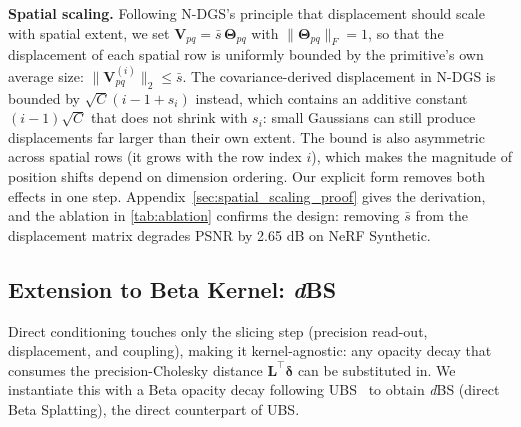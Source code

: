\documentclass{article}
\newcommand{\dbs}{\textit{d}BS\xspace}
\theoremstyle{plain}
\theoremstyle{definition}
\theoremstyle{remark}
\begin{document}
\textbf{Spatial scaling.} Following N-DGS's principle that displacement should scale with spatial extent, we set $\mathbf{V}_{pq}=\bar{s}\,\boldsymbol{\Theta}_{pq}$ with $\|\boldsymbol{\Theta}_{pq}\|_F=1$, so that the displacement of each spatial row is uniformly bounded by the primitive's own average size: $\|\mathbf{V}_{pq}^{(i)}\|_2\le\bar{s}$. The covariance-derived displacement in N-DGS is bounded by $\sqrt{C}(i-1+s_i)$ instead, which contains an additive constant $(i-1)\sqrt{C}$ that does not shrink with $s_i$: small Gaussians can still produce displacements far larger than their own extent. The bound is also asymmetric across spatial rows (it grows with the row index $i$), which makes the magnitude of position shifts depend on dimension ordering. Our explicit form removes both effects in one step. Appendix~\ref{sec:spatial_scaling_proof} gives the derivation, and the ablation in \cref{tab:ablation} confirms the design: removing $\bar{s}$ from the displacement matrix degrades PSNR by 2.65 dB on NeRF Synthetic.




\subsection{Extension to Beta Kernel: \dbs{}}
\label{subsec:dbs}

Direct conditioning touches only the slicing step (precision read-out, displacement, and coupling), making it kernel-agnostic: any opacity decay that consumes the precision-Cholesky distance $\mathbf{L}^\top\boldsymbol{\delta}$ can be substituted in. We instantiate this with a Beta opacity decay following UBS~\citep{liu2025universal} to obtain \dbs{} (direct Beta Splatting), the direct counterpart of UBS.
\end{document}
